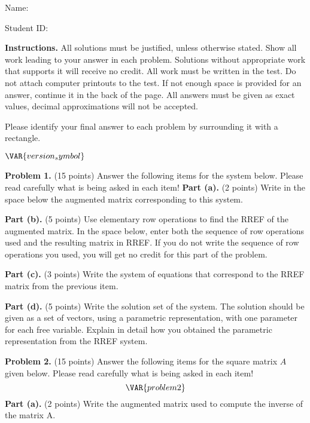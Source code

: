 \documentclass[12pt]{article}
\begin{document}
Name: \hrulefill

\bigskip
Student ID: \hrulefill

\bigskip
\textbf{Instructions.} All solutions must be justified, unless otherwise stated. Show all work leading to your answer in each problem. Solutions without appropriate work that supports it will receive no credit. All work must be written in the test. Do not attach computer printouts to the test. If not enough space is provided for an answer, continue it in the back of the page. All answers must be given as exact values, decimal approximations will not be accepted.

Please identify your final answer to each problem by surrounding it with a rectangle.

\vfill
\hfill$\VAR{version_symbol}$

\clearpage

\textbf{Problem 1.} (15 points)
Answer the following items for the system below. Please read carefully what is being asked in each item!
\textbf{Part (a).} (2 points) Write in the space below the augmented matrix corresponding to this system.

\vskip1.5in

\textbf{Part (b).} (5 points) Use elementary row operations to find the RREF of the augmented matrix. In the space below, enter both the sequence of row operations used and the resulting matrix in RREF. If you do not write the sequence of row operations you used, you will get no credit for this part of the problem.

\clearpage

\textbf{Part (c).} (3 points) Write the system of equations that correspond to the RREF matrix from the previous item.

\vskip2in

\textbf{Part (d).} (5 points) Write the solution set of the system. The solution should be given as a set of vectors, using a parametric representation, with one parameter for each free variable. Explain in detail how you obtained the parametric representation from the RREF system.

\clearpage


\textbf{Problem 2.} (15 points) Answer the following items for the square matrix $A$ given below. Please read carefully what is being asked in each item!
\[
\VAR{problem2}
\]
\textbf{Part (a).} (2 points) Write the augmented matrix used to compute the inverse of the matrix A.

\vskip1.5in
\end{document}
